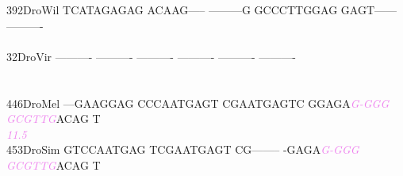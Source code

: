 \documentclass[11pt,twoside,reqno,a4paper]{article}
\begin{document}
{392\hspace*{1\charwidth}DroWil	TCATAGAGAG	ACAAG-----	---------G	GCCCTTGGAG	GAGT------	----------	\\
\hspace*{4\charwidth}\hspace*{7\charwidth}\hspace*{1\charwidth}\hspace*{1\charwidth}\hspace*{1\charwidth}\hspace*{1\charwidth}\hspace*{1\charwidth}\hspace*{1\charwidth}\\
32\hspace*{2\charwidth}DroVir	----------	----------	----------	----------	----------	----------	\\
\hspace*{4\charwidth}\hspace*{7\charwidth}\hspace*{1\charwidth}\hspace*{1\charwidth}\hspace*{1\charwidth}\hspace*{1\charwidth}\hspace*{1\charwidth}\hspace*{1\charwidth}\\
\\
446\hspace*{1\charwidth}DroMel	---GAAGGAG	CCCAATGAGT	CGAATGAGTC	GGAGA\textit{\textcolor{violet}{G}}\textit{\textcolor{violet}{-}}\textit{\textcolor{violet}{G}}\textit{\textcolor{violet}{G}}\textit{\textcolor{violet}{G}}	\textit{\textcolor{violet}{G}}\textit{\textcolor{violet}{C}}\textit{\textcolor{violet}{G}}\textit{\textcolor{violet}{T}}\textit{\textcolor{violet}{T}}\textit{\textcolor{violet}{G}}ACAG	T\\
\hspace*{4\charwidth}\hspace*{7\charwidth}\hspace*{1\charwidth}\hspace*{1\charwidth}\hspace*{1\charwidth}\hspace*{35\charwidth}\textit{\textcolor{violet}{11.5}}\hspace*{1\charwidth}\hspace*{1\charwidth}\\
453\hspace*{1\charwidth}DroSim	GTCCAATGAG	TCGAATGAGT	CG--------	-GAGA\textit{\textcolor{violet}{G}}\textit{\textcolor{violet}{-}}\textit{\textcolor{violet}{G}}\textit{\textcolor{violet}{G}}\textit{\textcolor{violet}{G}}	\textit{\textcolor{violet}{G}}\textit{\textcolor{violet}{C}}\textit{\textcolor{violet}{G}}\textit{\textcolor{violet}{T}}\textit{\textcolor{violet}{T}}\textit{\textcolor{violet}{G}}ACAG	T\\
}
\end{document}
